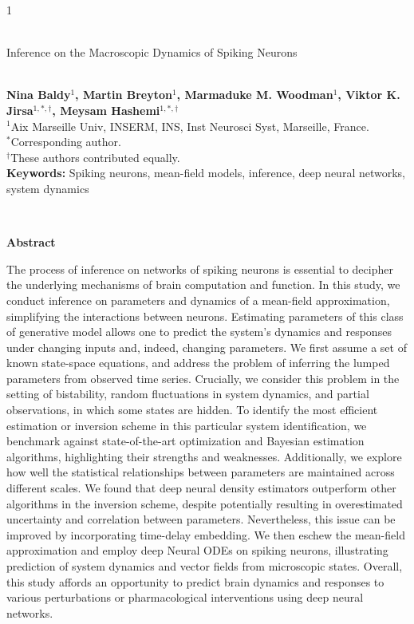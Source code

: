 \documentclass[12pt]{article}
\begin{document}
\hspace{13.9cm}1

\ \vspace{20mm}\\

{\LARGE Inference on the Macroscopic Dynamics of Spiking Neurons}

\ \\
{\bf \large Nina Baldy$^{\displaystyle 1}$, Martin Breyton$^{\displaystyle 1}$, Marmaduke M. Woodman$^{\displaystyle 1}$, Viktor K. Jirsa$^{\displaystyle 1, \displaystyle *, \displaystyle \dag}$, Meysam Hashemi$^{\displaystyle 1, \displaystyle *, \displaystyle \dag}$} \\
{$^{\displaystyle 1}$Aix Marseille Univ, INSERM, INS, Inst Neurosci Syst, Marseille, France.} \\
{$^{\displaystyle *}$Corresponding author.} \\
{$^{\displaystyle \dag}$These authors contributed equally.}\\
%

{\bf Keywords:} Spiking neurons, mean-field models, inference, deep neural networks, system dynamics

\thispagestyle{empty}
%
\ \vspace{-0mm}\\
%
\begin{center} {\bf Abstract} \end{center}
The process of inference on networks of spiking neurons is essential to decipher the underlying mechanisms of brain computation and function. In this study, we conduct inference on parameters and dynamics of a mean-field approximation, simplifying the interactions between neurons. Estimating parameters of this class of generative model allows one to predict the system's dynamics and responses under changing inputs and, indeed, changing parameters. We first assume a set of known state-space equations, and address the problem of inferring the lumped parameters from observed time series. Crucially, we consider this problem in the setting of bistability, random fluctuations in system dynamics, and partial observations, in which some states are hidden. To identify the most efficient estimation or inversion scheme in this particular system identification, we benchmark against state-of-the-art optimization and Bayesian estimation algorithms, highlighting their strengths and weaknesses. Additionally, we explore how well the statistical relationships between parameters are maintained across different scales. We found that deep neural density estimators outperform other algorithms in the inversion scheme, despite potentially resulting in overestimated uncertainty and correlation between parameters. Nevertheless, this issue can be improved by incorporating time-delay embedding. We then eschew the mean-field approximation and employ deep Neural ODEs on spiking neurons, illustrating prediction of system dynamics and vector fields from microscopic states. Overall, this study affords an opportunity to predict brain dynamics and responses to various perturbations or pharmacological interventions using deep neural networks.
\end{document}
